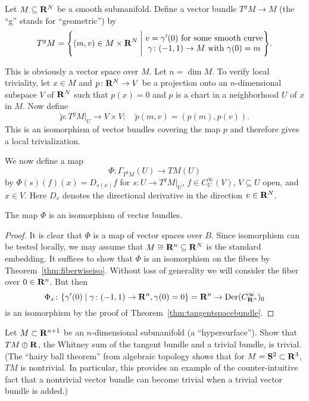 \documentclass[a4paper,openany]{scrbook}
\DeclareMathOperator{\Der}{Der}
\begin{document}
\begin{defn}
Let $M \subseteq \mathbf R^N$ be a smooth submanifold. Define a vector bundle $T^gM \to M$ (the ``g'' stands for ``geometric'') by
\[
T^gM = \Biggl\{(m,v) \in M \times \mathbf R^N \Biggm| \begin{matrix}v = \gamma'(0) \text{ for some smooth curve}\\\gamma\colon (-1,1) \to M \text{ with } \gamma(0)=m\end{matrix}\Biggr\}.
\]
\end{defn}
This is obviously a vector space over $M$. Let $n = \dim M$. To verify local triviality, let $x \in M$ and $p\colon \mathbf R^N \to V$ be a projection onto an $n$-dimensional subspace $V$ of $\mathbf R^N$ such that $p(x)=0$ and $p$ is a chart in a neighborhood $U$ of $x$ in $M$. Now define
\[
\tilde p\colon T^gM|_U \to V \times V; \quad \tilde p(m,v) = (p(m),p(v)).
\]
This is an isomorphism of vector bundles covering the map $p$ and therefore gives a local trivialization.

We now define a map
\[
\Phi\colon \Gamma_{T^gM}(U) \to TM(U)
\]
by $\Phi(s)(f)(x) = D_{s(x)}f$ for $s\colon U \to T^gM|_U$, $f \in C^\infty_U(V)$, $V \subseteq U$ open, and $x \in V$. Here $D_v$ denotes the directional derivative in the direction $v \in \mathbf R^N$.

\begin{prop}
The map $\Phi$ is an isomorphism of vector bundles.
\end{prop}
\begin{proof}
It is clear that $\Phi$ is a map of vector spaces over $B$. Since isomorphism can be tested locally, we may assume that $M \cong \mathbf R^n \subseteq \mathbf R^N$ is the standard embedding.
It suffices to show that $\Phi$ is an isomorphism on the fibers by Theorem~\ref{thm:fiberwiseiso}. Without loss of generality we will consider the fiber over $0 \in \mathbf R^n$. But then
\[
\Phi_x\colon \{ \gamma'(0) \mid \gamma\colon (-1,1) \to \R^n, \gamma(0)=0\} = \R^n \to \Der(C^\infty_{\R^n})_0
\]
is an isomorphism by the proof of Theorem~\ref{thm:tangentspacebundle}.
\end{proof}

\begin{exer}
Let $M \subset \mathbf R^{n+1}$ be an $n$-dimensional submanifold (a ``hypersurface''). Show that $TM \oplus \mathbf R$, the Whitney sum of the tangent bundle and a trivial bundle, is trivial. (The ``hairy ball theorem'' from algebraic topology \cite{hatcher:AT} shows that for $M=\mathbf S^2 \subset \mathbf R^3$, $TM$ is nontrivial. In particular, this provides an example of the counter-intuitive fact that a nontrivial vector bundle can become trivial when a trivial vector bundle is added.)
\end{exer}
\end{document}
